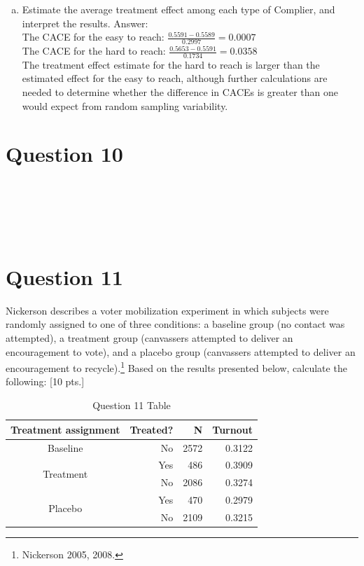 \documentclass[11pt,notitlepage]{article}\usepackage[]{graphicx}\usepackage[]{color}
\makeatletter
\newenvironment{kframe}{%
 \def\at@end@of@kframe{}%
 \ifinner\ifhmode%
  \def\at@end@of@kframe{\end{minipage}}%
  \begin{minipage}{\columnwidth}%
 \fi\fi%
 \def\FrameCommand##1{\hskip\@totalleftmargin \hskip-\fboxsep
 \colorbox{shadecolor}{##1}\hskip-\fboxsep
     \hskip-\linewidth \hskip-\@totalleftmargin \hskip\columnwidth}%
 \MakeFramed {\advance\hsize-\width
   \@totalleftmargin\z@ \linewidth\hsize
   \@setminipage}}%
 {\par\unskip\endMakeFramed%
 \at@end@of@kframe}
\newenvironment{knitrout}{}{} %
\makeatother
\begin{document}
\begin{enumerate}[a)]
\item Estimate the average treatment effect among each type of Complier, and interpret the results.
Answer:\\
The CACE for the easy to reach: $\frac{0.5591 - 0.5589}{0.2997} = 0.0007$ \\ 
The CACE for the hard to reach: $\frac{0.5653 - 0.5591}{0.1734} = 0.0358$ \\
The treatment effect estimate for the hard to reach is larger than the estimated effect for the easy to reach, although further calculations are needed to determine whether the difference in CACEs is greater than one would expect from random sampling variability.

\end{enumerate}

\section*{Question 10}
\begin{knitrout}
\color{fgcolor}\begin{kframe}
\begin{verbatim}





\end{verbatim}
\end{kframe}
\end{knitrout}


\section*{Question 11}
Nickerson describes a voter mobilization experiment in which subjects were randomly assigned to one of three conditions: a baseline group (no contact was attempted), a treatment group (canvassers attempted to deliver an encouragement to vote), and a placebo group (canvassers attempted to deliver an encouragement to recycle).\footnote{Nickerson 2005, 2008.} Based on the results presented below, calculate the following: [10 pts.]
\begin{table}[H]
  \centering
  \caption{Question 11 Table}
    \begin{tabular}{rrrr}
    \toprule
    Treatment assignment  & Treated?  & N     & Turnout  \\
    \midrule
    \multicolumn{1}{c}{Baseline}  & No    & 2572  & 0.3122 \\
    \multicolumn{1}{c}{\multirow{2}[0]{*}{Treatment }} & Yes   & 486   & 0.3909 \\
    \multicolumn{1}{c}{} & No    & 2086  & 0.3274 \\
    \multicolumn{1}{c}{\multirow{2}[0]{*}{Placebo }} & Yes   & 470   & 0.2979 \\
    \multicolumn{1}{c}{} & No    & 2109  & 0.3215 \\
    \bottomrule
    \end{tabular}%
  \label{tab:addlabel}%
\end{table}%
\end{document}
